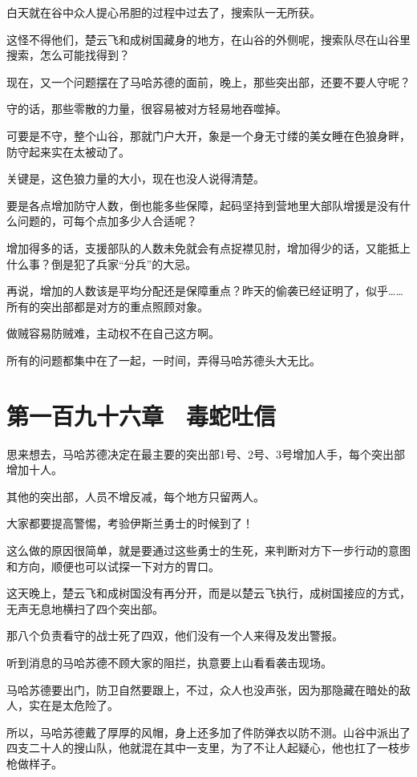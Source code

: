 白天就在谷中众人提心吊胆的过程中过去了，搜索队一无所获。

这怪不得他们，楚云飞和成树国藏身的地方，在山谷的外侧呢，搜索队尽在山谷里搜索，怎么可能找得到？

现在，又一个问题摆在了马哈苏德的面前，晚上，那些突出部，还要不要人守呢？

守的话，那些零散的力量，很容易被对方轻易地吞噬掉。

可要是不守，整个山谷，那就门户大开，象是一个身无寸缕的美女睡在色狼身畔，防守起来实在太被动了。

关键是，这色狼力量的大小，现在也没人说得清楚。

要是各点增加防守人数，倒也能多些保障，起码坚持到营地里大部队增援是没有什么问题的，可每个点加多少人合适呢？

增加得多的话，支援部队的人数未免就会有点捉襟见肘，增加得少的话，又能抵上什么事？倒是犯了兵家“分兵”的大忌。

再说，增加的人数该是平均分配还是保障重点？昨天的偷袭已经证明了，似乎……所有的突出部都是对方的重点照顾对象。

做贼容易防贼难，主动权不在自己这方啊。

所有的问题都集中在了一起，一时间，弄得马哈苏德头大无比。

\section{第一百九十六章　毒蛇吐信}

思来想去，马哈苏德决定在最主要的突出部1号、2号、3号增加人手，每个突出部增加十人。

其他的突出部，人员不增反减，每个地方只留两人。

大家都要提高警惕，考验伊斯兰勇士的时候到了！

这么做的原因很简单，就是要通过这些勇士的生死，来判断对方下一步行动的意图和方向，顺便也可以试探一下对方的胃口。

这天晚上，楚云飞和成树国没有再分开，而是以楚云飞执行，成树国接应的方式，无声无息地横扫了四个突出部。

那八个负责看守的战士死了四双，他们没有一个人来得及发出警报。

听到消息的马哈苏德不顾大家的阻拦，执意要上山看看袭击现场。

马哈苏德要出门，防卫自然要跟上，不过，众人也没声张，因为那隐藏在暗处的敌人，实在是太危险了。

所以，马哈苏德戴了厚厚的风帽，身上还多加了件防弹衣以防不测。山谷中派出了四支二十人的搜山队，他就混在其中一支里，为了不让人起疑心，他也扛了一枝步枪做样子。

